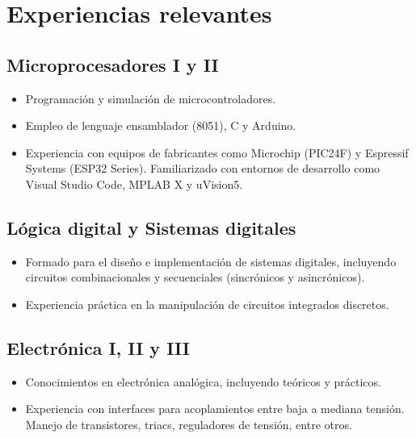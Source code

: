 \documentclass[11pt]{article} %
\begin{document}
\section*{Experiencias relevantes}

\subsection*{Microprocesadores I y II}

\begin{itemize}
\itemsep0em
\item Programación y simulación de microcontroladores.
\item Empleo de lenguaje ensamblador (8051), C y Arduino.
\item Experiencia con equipos de fabricantes como Microchip (PIC24F) y Espressif Systems (ESP32 Series). Familiarizado con entornos de desarrollo como Visual Studio Code, MPLAB X y uVision5.
\end{itemize}

\subsection*{Lógica digital y Sistemas digitales}

\begin{itemize}
\itemsep0em
\item Formado para el diseño e implementaci\'on de sistemas digitales, incluyendo circuitos combinacionales y secuenciales (sincrónicos y asincrónicos).
\item Experiencia pr\'actica en la manipulación de circuitos integrados discretos.
\end{itemize}

\subsection*{Electrónica I, II y III}

\begin{itemize}
\itemsep0em
\item Conocimientos en electrónica analógica, incluyendo teóricos y prácticos.
\item Experiencia con interfaces para acoplamientos entre baja a mediana tensión. Manejo de transistores, triacs, reguladores de tensión, entre otros.
\end{itemize}

\end{document}
